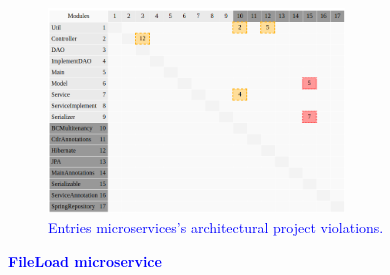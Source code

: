 \documentclass[12pt]{article}
\begin{document}
\begin{figure}[ht]
\centering
\includegraphics[width=0.7\textwidth]{figuras/violacoesEntries.png}
\caption{\textcolor{blue}{Entries microservices's architectural project violations.}}
\label{fig:microservices}
\end{figure}


\newpage
\noindent\textbf{\large{\textcolor{blue}{FileLoad microservice}}}
\label{sec:ApendiceFileLoad}
\end{document}
